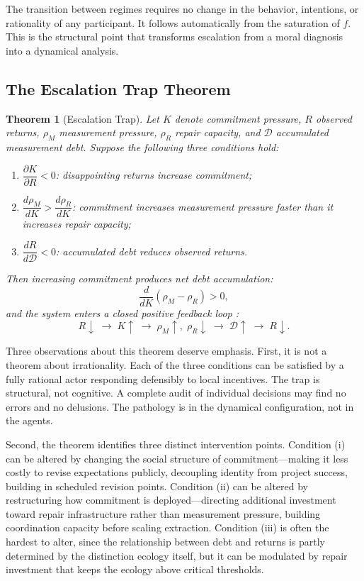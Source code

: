 \documentclass[12pt, a4paper]{article}
\theoremstyle{flyxion}
\newtheorem{theorem}{Theorem}
\newcommand{\rhoM}{\rho_{M}}
\newcommand{\rhoR}{\rho_{R}}
\begin{document}
The transition between regimes requires no change in the behavior, intentions, or rationality of any participant. It follows automatically from the saturation of $f$. This is the structural point that transforms escalation from a moral diagnosis into a dynamical analysis.

\subsection*{The Escalation Trap Theorem}

\begin{theorem}[Escalation Trap]
Let $K$ denote commitment pressure, $R$ observed returns, $\rhoM$ measurement pressure, $\rhoR$ repair capacity, and $\mathcal{D}$ accumulated measurement debt. Suppose the following three conditions hold:
\begin{enumerate}[label=(\roman*)]
  \item $\dfrac{\partial K}{\partial R} < 0$: disappointing returns increase commitment;
  \item $\dfrac{d\rhoM}{dK} > \dfrac{d\rhoR}{dK}$: commitment increases measurement pressure faster than it increases repair capacity;
  \item $\dfrac{dR}{d\mathcal{D}} < 0$: accumulated debt reduces observed returns.
\end{enumerate}
Then increasing commitment produces net debt accumulation:
\[
  \frac{d}{dK}(\rhoM - \rhoR) > 0,
\]
and the system enters a closed positive feedback loop \cite{sterman2000,meadows2008}:
\[
  R \downarrow \;\longrightarrow\; K \uparrow \;\longrightarrow\; \rhoM \uparrow,\; \rhoR \downarrow
  \;\longrightarrow\; \mathcal{D} \uparrow \;\longrightarrow\; R \downarrow.
\]
\end{theorem}

Three observations about this theorem deserve emphasis. First, it is not a theorem about irrationality. Each of the three conditions can be satisfied by a fully rational actor responding defensibly to local incentives. The trap is structural, not cognitive. A complete audit of individual decisions may find no errors and no delusions. The pathology is in the dynamical configuration, not in the agents.

Second, the theorem identifies three distinct intervention points. Condition (i) can be altered by changing the social structure of commitment---making it less costly to revise expectations publicly, decoupling identity from project success, building in scheduled revision points. Condition (ii) can be altered by restructuring how commitment is deployed---directing additional investment toward repair infrastructure rather than measurement pressure, building coordination capacity before scaling extraction. Condition (iii) is often the hardest to alter, since the relationship between debt and returns is partly determined by the distinction ecology itself, but it can be modulated by repair investment that keeps the ecology above critical thresholds.
\end{document}

